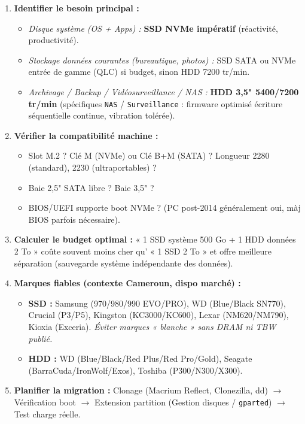 \documentclass[11pt]{article}
\begin{document}
\begin{methode}
\begin{enumerate}
    \item \textbf{Identifier le besoin principal :}
    \begin{itemize}
        \item \textit{Disque système (OS + Apps) :} \textbf{SSD NVMe impératif} (réactivité, productivité).
        \item \textit{Stockage données courantes (bureautique, photos) :} SSD SATA ou NVMe entrée de gamme (QLC) si budget, sinon HDD 7200 tr/min.
        \item \textit{Archivage / Backup / Vidéosurveillance / NAS :} \textbf{HDD 3,5" 5400/7200 tr/min} (spécifiques \texttt{NAS} / \texttt{Surveillance} : firmware optimisé écriture séquentielle continue, vibration tolérée).
    \end{itemize}
    \item \textbf{Vérifier la compatibilité machine :}
    \begin{itemize}
        \item Slot M.2 ? Clé M (NVMe) ou Clé B+M (SATA) ? Longueur 2280 (standard), 2230 (ultraportables) ?
        \item Baie 2,5" SATA libre ? Baie 3,5" ?
        \item BIOS/UEFI supporte boot NVMe ? (PC post-2014 généralement oui, màj BIOS parfois nécessaire).
    \end{itemize}
    \item \textbf{Calculer le budget optimal :} « 1 SSD système 500 Go + 1 HDD données 2 To » coûte souvent moins cher qu' « 1 SSD 2 To » et offre meilleure séparation (sauvegarde système indépendante des données).
    \item \textbf{Marques fiables (contexte Cameroun, dispo marché) :}
    \begin{itemize}
        \item \textbf{SSD :} Samsung (970/980/990 EVO/PRO), WD (Blue/Black SN770), Crucial (P3/P5), Kingston (KC3000/KC600), Lexar (NM620/NM790), Kioxia (Exceria). \emph{Éviter marques « blanche » sans DRAM ni TBW publié.}
        \item \textbf{HDD :} WD (Blue/Black/Red Plus/Red Pro/Gold), Seagate (BarraCuda/IronWolf/Exos), Toshiba (P300/N300/X300).
    \end{itemize}
    \item \textbf{Planifier la migration :} Clonage (Macrium Reflect, Clonezilla, dd) $\to$ Vérification boot $\to$ Extension partition (Gestion disques / \texttt{gparted}) $\to$ Test charge réelle.
\end{enumerate}
\end{methode}
\end{document}

